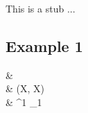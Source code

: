 This is a stub ...

\subsection{Example 1}

\begin{codealign}
  &
    \identity
    \prd
    \FunXX\
    \by
  \\[-3pt]
  &\quad
    \Apply(\prd X, \con X)
    \colon
  \\[-3pt]
  &\quad\quad
    \FunXX\text{-}\Apply^{1}
    \mkCmd
    \FunXX\text{-}\Apply_{1}
\end{codealign}
